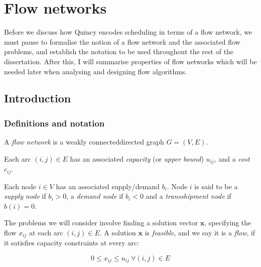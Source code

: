 
\section{Flow networks} \label{prep-flow}

Before we discuss how Quincy encodes scheduling in terms of a flow network, we must pause to formalise the notion of a flow network and the associated flow problems, and establish the notation to be used throughout the rest of the dissertation. After this, I will summarise properties of flow networks which will be needed later when analysing and designing flow algorithms.

\subsection{Introduction}

\subsubsection{Definitions and notation}

A \emph{flow network} is a weakly connected\footnotemark directed graph $G=(V,E)$.

Each arc $(i,j)\in E$ has an associated \emph{capacity} (or \emph{upper	bound}\footnotemark) $u_{ij}$, and a \emph{cost} $c_{ij}$.

Each node $i\in V$ has an associated supply/demand $b_{i}$. Node $i$ is said to be a \emph{supply node} if $b_{i}>0$, a \emph{demand	node} if $b_{i}<0$ and a \emph{transshipment node} if $b(i)=0$.

The problems we will consider involve finding a solution vector $\mathbf{x}$,
specifying the flow $x_{ij}$ at each arc $(i,j)\in E$. A solution
$\mathbf{x}$ is \emph{feasible}, and we say it is a \emph{flow}, if it satisfies capacity constraints at every arc:

\begin{equation} \label{eq:capacity-constraints}
0\leq x_{ij}\leq u_{ij}\:\forall(i,j)\in E
\end{equation}


